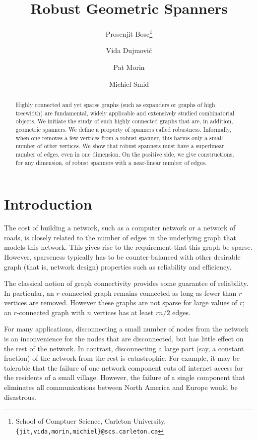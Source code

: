 \documentclass{cccg12}
\title{Robust Geometric Spanners}
\author{Prosenjit Bose\thanks{School of Comptuer Science, Carleton University, {\tt \{jit,vida,morin,michiel\}@scs.carleton.ca}}
  \and Vida Dujmovi\'c\footnotemark[1]
  \and Pat Morin\footnotemark[1]
  \and Michiel Smid\footnotemark[1]}
\begin{document}
\maketitle

\begin{abstract}
  Highly connected and yet sparse graphs (such as expanders or graphs
  of high treewidth) are fundamental, widely applicable and extensively
  studied combinatorial objects.  We initiate the study of such highly
  connected graphs that are, in addition, geometric spanners.  We define
  a property of spanners called robustness.  Informally, when one removes
  a few vertices from a robust spanner, this harms only a small number of
  other vertices.  We show that robust spanners must have a superlinear
  number of edges, even in one dimension.  On the positive side, we give
  constructions, for any dimension, of robust spanners with a near-linear
  number of edges.
\end{abstract}

\section{Introduction}

The cost of building a network, such as a computer network or a network
of roads, is closely related to the number of edges in the underlying
graph that models this network.  This gives rise to the requirement
that this graph be sparse.  However, sparseness typically has
to be counter-balanced with other desirable graph (that is, network
design) properties such as reliability and efficiency.

The classical notion of graph connectivity provides some guarantee of
reliability. In particular, an $r$-connected graph remains connected as
long as fewer than $r$ vertices are removed. However these graphs are
not sparse for large values of $r$;  an $r$-connected graph with $n$
vertices has at least $rn/2$ edges.

For many applications, disconnecting a small number of nodes from the
network is an inconvenience for the nodes that are disconnected, but has
little effect on the rest of the network.  In contrast, disconnecting
a large part (say, a constant fraction) of the network from the rest
is catastrophic.
For example, it may be tolerable that the failure of one network component
cuts off internet access for the residents of a small village. However,
the failure of a single component that eliminates all communications
between North America and Europe would be disastrous.
\end{document}
